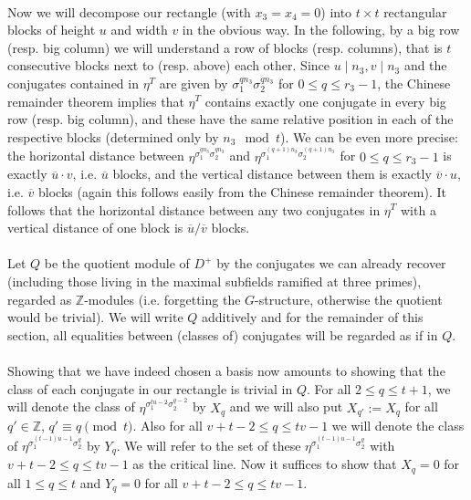\documentclass[12pt,a4paper]{article}
\newcommand{\Z}{\mathbb{Z}}
\newcommand{\uo}{\overline{u}}
\newcommand{\vo}{\overline{v}}
\begin{document}
\paragraph*{}
Now we will decompose our rectangle (with $x_3=x_4=0$) into $t\times t$ rectangular blocks of height $u$ and width $v$ in the obvious way. In the following, by a big row (resp. big column) we will understand a row of blocks (resp. columns), that is $t$ consecutive blocks next to (resp. above) each other. Since $u\mid n_3, v\mid n_3$ and the conjugates contained in $\eta^T$ are given by $\sigma_1^{qn_3}\sigma_2^{qn_3}$ for $0\leq q \leq r_3-1$, the Chinese remainder theorem implies that $\eta^T$ contains exactly one conjugate in every big row (resp. big column), and these have the same relative position in each of the respective blocks (determined only by $n_3 \mod t$). We can be even more precise: the horizontal distance between $\eta^{\sigma_1^{qn_3}\sigma_2^{qn_3}}$ and $\eta^ {\sigma_1^{(q+1)n_3}\sigma_2^{(q+1)n_3}}$ for $0\leq q \leq r_3-1$ is exactly $\uo\cdot v$, i.e. $\uo$ blocks, and the vertical distance between them is exactly $\vo\cdot u$, i.e. $\vo$ blocks (again this follows easily from the Chinese remainder theorem). It follows that the horizontal distance between any two conjugates in $\eta^T$ with a vertical distance of one block is $\uo/\vo$ blocks.
\paragraph*{}
Let $Q$ be the quotient module of $D^+$ by the conjugates we can already recover (including those living in the maximal subfields ramified at three primes), regarded as $\Z$-modules (i.e. forgetting the $G$-structure, otherwise the quotient would be trivial). We will write $Q$ additively and for the remainder of this section, all equalities between (classes of) conjugates will be regarded as if in $Q$.
\paragraph*{}
Showing that we have indeed chosen a basis now amounts to showing that the class of each conjugate in our rectangle is trivial in $Q$. For all $2\leq q\leq t+1$, we will denote the class of $\eta^{\sigma_1^{tu-2}\sigma_2^{q-2}}$ by $X_q$ and we will also put $X_{q'}:=X_q$ for all $q'\in\Z$, $q'\equiv q\pmod{t}$. Also for all $v+t-2\leq q\leq tv-1$ we will denote the class of $\eta^{\sigma_1^{(t-1)u-1}\sigma_2^q}$ by $Y_q$. We will refer to the set of these $\eta^{\sigma_1^{(t-1)u-1}\sigma_2^q}$ with $v+t-2\leq q\leq tv-1$ as the critical line. Now it suffices to show that $X_q=0$ for all $1\leq q\leq t$ and $Y_q=0$ for all $v+t-2\leq q\leq tv-1$.
\end{document}
